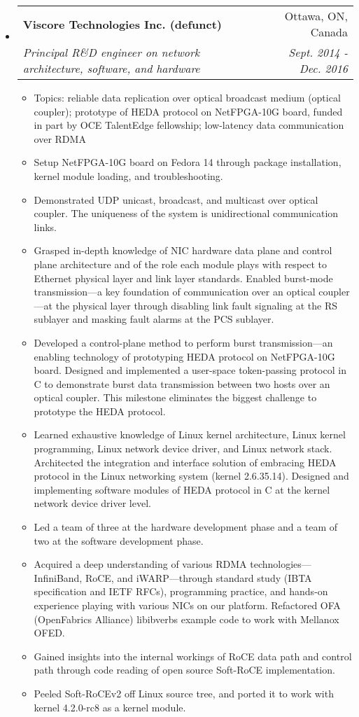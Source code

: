 \documentclass[letterpaper,11pt]{article}
\makeatletter
\newcommand{\ressubheading}[4]{
\begin{tabular*}{6.69in}{l@{\extracolsep{\fill}}r}
        \textbf{#1} & #2 \\
        \textit{#3} & \textit{#4} \\
\end{tabular*}\vspace{-6pt}
}
\newcommand{\resitem}[1]{\item #1 \vspace{-2pt}}
\makeatother
\begin{document}
\begin{itemize}
\item
  \ressubheading{Viscore Technologies Inc. (defunct)}{Ottawa, ON, Canada}
  {Principal R\&D engineer on network architecture, software, and hardware}{Sept. 2014 - Dec. 2016}
  \begin{itemize}
    \resitem{Topics: reliable data replication over optical broadcast medium (optical coupler); prototype of HEDA protocol on NetFPGA-10G board,
    funded in part by OCE TalentEdge fellowship; low-latency data communication over RDMA}
    \resitem{Setup NetFPGA-10G board on Fedora 14 through package installation, kernel module loading, and troubleshooting.}
    \resitem{Demonstrated UDP unicast, broadcast, and multicast over optical coupler. The uniqueness of the system is unidirectional communication links.}
    \resitem{Grasped in-depth knowledge of NIC hardware data plane and control plane architecture and of the role each module plays
    with respect to Ethernet physical layer and link layer standards.
    Enabled burst-mode transmission---a key foundation of communication over an optical coupler---at the physical layer
    through disabling link fault signaling at the RS sublayer and masking fault alarms at the PCS sublayer.}
    \resitem{Developed a control-plane method to perform burst transmission---an enabling technology of prototyping HEDA protocol on NetFPGA-10G board.
    Designed and implemented a user-space token-passing protocol in C to demonstrate burst data transmission between two hosts over an optical coupler.
    This milestone eliminates the biggest challenge to prototype the HEDA protocol.}
    \resitem{Learned exhaustive knowledge of Linux kernel architecture, Linux kernel programming, Linux network device driver, and Linux network stack.
    Architected the integration and interface solution of embracing HEDA protocol in the Linux networking system (kernel 2.6.35.14).
    Designed and implementing software modules of HEDA protocol in C at the kernel network device driver level.}
    \resitem{Led a team of three at the hardware development phase and a team of two at the software development phase.}
    \resitem{Acquired a deep understanding of various RDMA technologies---InfiniBand, RoCE, and iWARP---through
    standard study (IBTA specification and IETF RFCs), programming practice, and hands-on experience playing with various NICs on our platform.
    Refactored OFA (OpenFabrics Alliance) libibverbs example code to work with Mellanox OFED.}
    \resitem{Gained insights into the internal workings of RoCE data path and control path through code reading of open source Soft-RoCE implementation.}
    \resitem{Peeled Soft-RoCEv2 off Linux source tree, and ported it to work with kernel 4.2.0-rc8 as a kernel module.}
  \end{itemize}



\end{itemize}
\end{document}
